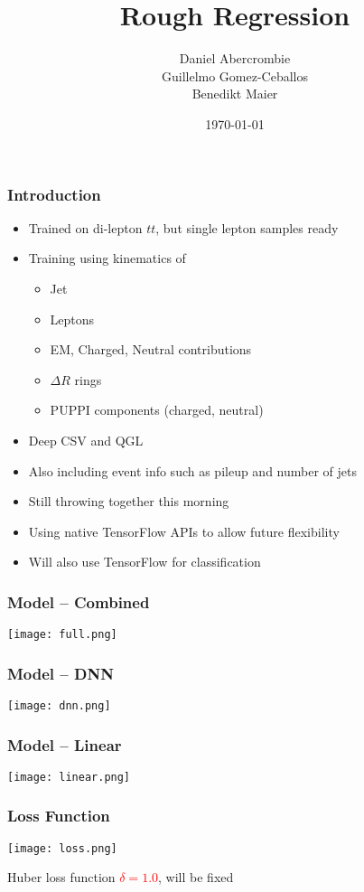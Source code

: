 \documentclass{beamer}
\author[D. Abercrombie]{
  Daniel Abercrombie \\
  Guillelmo Gomez-Ceballos \\
  Benedikt Maier
}
\title{\bf \sffamily Rough Regression}
\date{\today}
\begin{document}
\begin{frame}
  \titlepage
\end{frame}

\begin{frame}
  \frametitle{Introduction}

  \begin{itemize}
  \item Trained on di-lepton $tt$, but single lepton samples ready
  \item Training using kinematics of
    \begin{itemize}
    \item Jet
    \item Leptons
    \item EM, Charged, Neutral contributions
    \item $\Delta R$ rings
    \item PUPPI components (charged, neutral)
    \end{itemize}
  \item Deep CSV and QGL
  \item Also including event info such as pileup and number of jets
  \item Still throwing together this morning
  \item Using native TensorFlow APIs to allow future flexibility
  \item Will also use TensorFlow for classification
  \end{itemize}

\end{frame}

\begin{frame}
  \frametitle{Model -- Combined}
  \centering
  \texttt{[image: full.png]}
\end{frame}

\begin{frame}
  \frametitle{Model -- DNN}
  \centering
  \texttt{[image: dnn.png]}
\end{frame}

\begin{frame}
  \frametitle{Model -- Linear}
  \centering
  \texttt{[image: linear.png]}
\end{frame}

\begin{frame}
  \frametitle{Loss Function}
  \centering
  \texttt{[image: loss.png]}

  Huber loss function \textcolor{red}{$\delta = 1.0$}, will be fixed

\end{frame}
\end{document}
